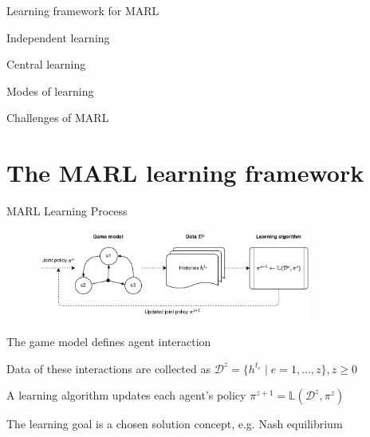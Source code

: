 

\leoslide

\subtitle{Multi-Agent Reinforcement Learning in Games: First Steps and Challenges}


\maketitle

\introslide

\begin{frame}{\outline}

\blist
    \item Learning framework for MARL
    \item Independent learning
    \item Central learning
    \item Modes of learning
    \item Challenges of MARL
\elist
\end{frame}

\section{The MARL learning framework}

\begin{frame}[t]{MARL Learning Process}

\begin{figure}
    \centering
    \includegraphics[width=0.8\textwidth, height = 0.8\textheight, keepaspectratio]{images/chapter_5/learning-process.pdf}
    \label{fig:enter-label}
\end{figure}

\blist
    \item The game model defines agent interaction
    \item Data of these interactions are collected as $\mathcal{D}^{z} = \{ h^{t_e} \mid e = 1, \ldots, z\}, z \geq 0$
    \item A learning algorithm updates each agent's policy $\pi^{z+1} = \mathbb{L}(\mathcal{D}^{z}, \pi^{z})$
    \item The learning goal is a chosen solution concept, e.g. Nash equilibrium
\elist
    
\end{frame}

